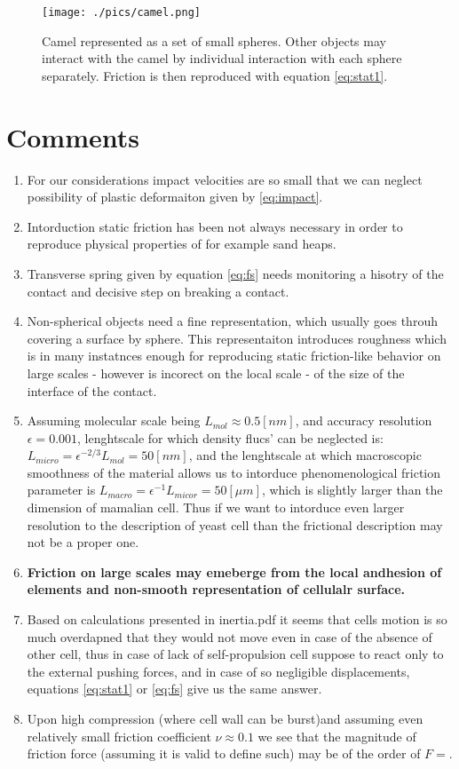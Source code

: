 \documentclass[10pt,a4paper]{article}
\begin{document}
\begin{figure}[tb]
\centering
\texttt{[image: ./pics/camel.png]}
\caption{Camel represented as a set of small spheres\cite{mucha05}. Other objects may interact with the camel by individual interaction with each sphere separately.
Friction is then reproduced with equation \ref{eq:stat1}.}
\label{fig:camel}
\end{figure}

\section{Comments}
\begin{enumerate}
 \item For our considerations impact velocities are so small that we can neglect possibility of plastic deformaiton given by \ref{eq:impact}.
 \item Intorduction static friction has been not always necessary in order to reproduce physical properties of for example sand heaps.
 \item Transverse spring given by equation \ref{eq:fs} needs monitoring a hisotry of the contact and decisive step on breaking a contact.
 \item Non-spherical objects need a fine representation, which usually goes throuh covering a surface by sphere. This representaiton 
 introduces roughness which is in many instatnces enough for reproducing static friction-like behavior on large scales - however is incorect on the local
 scale - of the size of the interface of the contact.
 \item Assuming molecular scale being $L_{mol}\approx 0.5 [nm]$, and accuracy resolution $\epsilon=0.001$, lenghtscale for which density flucs' can be neglected is:
 $L_{micro} = \epsilon^{-2/3} L_{mol} = 50 [nm]$, and the lenghtscale at which macroscopic smoothness of the material allows us to intorduce phenomenological friction
 parameter is $L_{macro} = \epsilon^{-1} L_{micor} = 50[\mu m]$, which is slightly larger than the dimension of mamalian cell. Thus if we want to intorduce even larger resolution 
 to the description of yeast cell than the frictional description may not be a proper one.
 \item \textbf{Friction on large scales may emeberge from the local andhesion of elements and non-smooth representation of cellulalr surface.}
 \item Based on calculations presented in inertia.pdf it seems that cells motion is so much overdapned that they would not move even in case of the absence of 
 other cell, thus in case of lack of self-propulsion cell suppose to react only to the external pushing forces, and in case of so negligible displacements,
 equations \ref{eq:stat1} or  \ref{eq:fs} give us the same answer. 
 \item Upon high compression (where cell wall can be burst)and assuming even relatively small friction coefficient $\nu \approx 0.1$ we see that 
 the magnitude of friction force (assuming it is valid to define such) may be of the order of $F = $.
 
\end{enumerate}




\thispagestyle{empty} %




\clearpage
\end{document}
